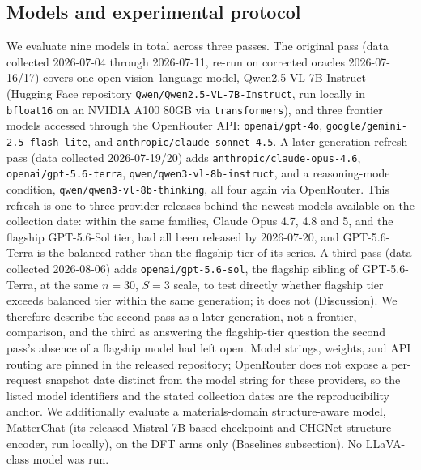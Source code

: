 \documentclass[pdflatex,sn-nature]{sn-jnl}
\begin{document}
\subsection*{Models and experimental protocol}
We evaluate nine models in total across three passes. The original pass (data collected
2026-07-04 through 2026-07-11, re-run on corrected oracles 2026-07-16/17) covers one open
vision--language model, Qwen2.5-VL-7B-Instruct\cite{qwen25vl} (Hugging Face repository
\texttt{Qwen/Qwen2.5-VL-7B-Instruct}, run locally in \texttt{bfloat16} on an NVIDIA A100
80GB via \texttt{transformers}), and three frontier models accessed through the OpenRouter
API: \texttt{openai/gpt-4o}, \texttt{google/gemini-2.5-flash-lite}, and
\texttt{anthropic/claude-sonnet-4.5}. A later-generation refresh pass (data collected
2026-07-19/20) adds \texttt{anthropic/claude-opus-4.6},
\texttt{openai/gpt-5.6-terra}, \texttt{qwen/qwen3-vl-8b-instruct},
and a reasoning-mode condition, \texttt{qwen/qwen3-vl-8b-thinking}, all four again via
OpenRouter. This refresh is one to three provider releases behind the newest models
available on the collection date: within the same families, Claude Opus 4.7, 4.8 and 5,
and the flagship GPT-5.6-Sol tier, had all been released by 2026-07-20, and GPT-5.6-Terra
is the balanced rather than the flagship tier of its series. A third pass (data collected
2026-08-06) adds \texttt{openai/gpt-5.6-sol}, the flagship sibling of GPT-5.6-Terra, at the
same $n=30$, $S=3$ scale, to test directly whether flagship tier exceeds balanced tier
within the same generation; it does not (Discussion). We therefore describe the second
pass as a later-generation, not a frontier, comparison, and the third as answering the
flagship-tier question the second pass's absence of a flagship model had left open. Model strings, weights, and
API routing are pinned in the released repository; OpenRouter does not expose a
per-request snapshot date distinct from the model string for these providers, so the
listed model identifiers and the stated collection dates are the reproducibility anchor. We additionally evaluate a materials-domain
structure-aware model, MatterChat\cite{matterchat2026} (its released Mistral-7B-based
checkpoint and CHGNet structure encoder, run locally), on the DFT arms only (Baselines
subsection). No LLaVA-class model was run.
\end{document}
